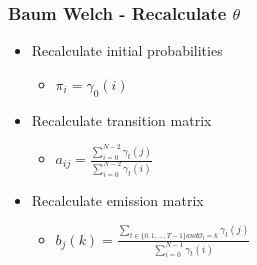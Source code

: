 \begin{frame}
	\frametitle{Baum Welch - Recalculate $\theta$}
	\begin{itemize}
		\item Recalculate initial probabilities
		\begin{itemize}
			\item $\pi_i = \gamma_0(i)$
		\end{itemize}
		\item Recalculate transition matrix
		\begin{itemize}
			\item $a_{ij} = \frac{\sum\limits_{i=0}^{N-2} \gamma_t (j)}{\sum\limits_{i=0}^{N-2} \gamma_t(i)}$
		\end{itemize}
		\item Recalculate emission matrix
		\begin{itemize}
			\item $b_j(k) = \frac{\sum\limits_{t \in \{0,1,\dots,T-1\} and \mathcal{O}_t=k} \gamma_t (j)}{\sum\limits_{i=0}^{N-1} \gamma_t(i)}$
		\end{itemize}
	\end{itemize}
\end{frame}